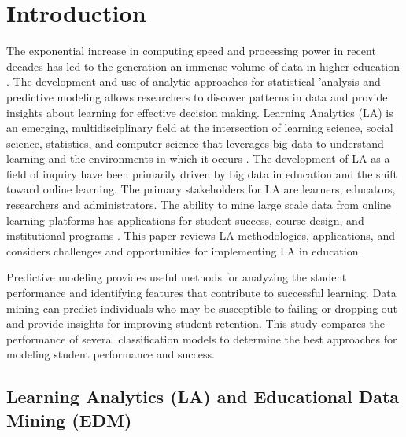 \documentclass[sigconf]{acmart}
\begin{document}
\maketitle

\section{Introduction}

The exponential increase in computing speed and processing power in recent 
decades has led to the generation an immense volume of data in higher education 
\cite{Daniel17}. The development and use of analytic approaches for 
statistical 'analysis and predictive modeling allows researchers to discover 
patterns in data and provide insights about learning for effective decision 
making. Learning Analytics (LA) is an emerging, multidisciplinary field at 
the intersection of learning science, social science, statistics, and computer 
science that leverages big data to understand learning and the environments 
in which it occurs \cite{siemens13}. The development of LA as a field of 
inquiry have been primarily driven by big data in education and the shift 
toward online learning. The primary stakeholders for LA are learners, educators, 
researchers and administrators. The ability to mine large scale data from online 
learning platforms has applications for student success, course design, and 
institutional programs \cite{Lester19}. This paper reviews LA methodologies, 
applications, and considers challenges and opportunities for implementing 
LA in education.

Predictive modeling provides useful methods for analyzing the student 
performance and identifying features that contribute to successful learning. 
Data mining can predict individuals who may be susceptible to failing or 
dropping out and provide insights for improving student retention. This study 
compares the performance of several classification models to determine the 
best approaches for modeling student performance and success. 


\subsection{Learning Analytics (LA) and Educational Data Mining (EDM)}
\end{document}
